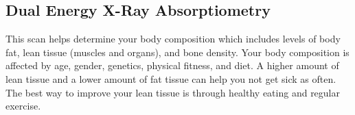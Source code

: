 \subsection{Dual Energy X-Ray Absorptiometry}

This scan helps determine your body composition which includes levels of body
fat, lean tissue (muscles and organs), and bone density. Your body composition
is affected by age, gender, genetics, physical fitness, and diet. A higher
amount of lean tissue and a lower amount of fat tissue can help you not get sick
as often. The best way to improve your lean tissue is through healthy eating and
regular exercise.